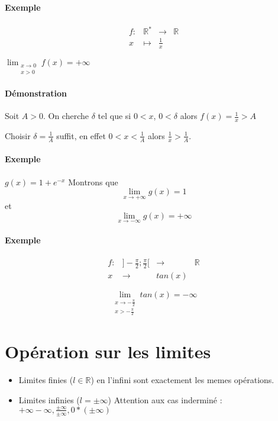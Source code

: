 \paragraph{Exemple}

\[\begin{array}{rccl}
	f:& \mathbb{R}^* &\rightarrow & \mathbb{R} \\
	x&\mapsto& \frac{1}{x}
\end{array}\]

$\lim_{\substack{x \to 0 \\ x > 0}} f(x) = +\infty$
\paragraph{Démonstration} Soit $A>0$. On cherche $\delta$ tel que si $0<x$, $0<\delta$ alors $f(x) = \frac{1}{x} > A$

Choisir $\delta = \frac{1}{A}$ suffit, en effet $0<x<\frac{1}{A}$ alors $\frac{1}{x} > \frac{1}{A}$.

\paragraph{Exemple}
$g(x) = 1+e^{-x}$ Montrons que \[\lim_{x \to +\infty} g(x) = 1\] et \[\lim_{x \to -\infty}g(x) = +\infty\]

\paragraph{Exemple}
\[\begin{array}{rccl}
f:& ]-\frac{\pi}{2}; \frac{\pi}{2}[ &\rightarrow & \mathbb{R} \\
	x&\rightarrow& tan(x)
\end{array}\]

\[\lim_{\substack{x \to -\frac{\pi}{2} \\  x > - \frac{\pi}{2}}} tan(x) = -\infty\]

\section{Opération sur les limites}
\begin{itemize}
	\item Limites finies ($l\in \mathbb{R}$) en l'infini sont exactement les memes opérations.
	\item Limites infinies ($l = \pm \infty$) Attention aux cas inderminé :
		~\\
		$+\infty - \infty, \frac{\pm \infty}{\pm\infty}, 0*(\pm\infty)$
\end{itemize}

